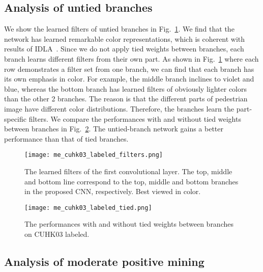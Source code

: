 \documentclass[10pt,twocolumn,letterpaper]{article}
\begin{document}
\subsection{Analysis of untied branches}
\label{section_Filter_visualization}

We show the learned filters of untied branches in Fig.~\ref{fig_filters_cuhk03}.
We find that the network has learned remarkable color representations, which is coherent with results of IDLA~\cite{ahmed2015improved}.
Since we do not apply tied weights between branches, each branch learns different filters from their own part.
As shown in Fig.~\ref{fig_filters_cuhk03} where each row demonstrates a filter set from one branch,
we can find that each branch has its own emphasis in color.
For example, the middle branch inclines to violet and blue, whereas the bottom branch has learned filters of obviously lighter colors than the other 2 branches.
The reason is that the different parts of pedestrian image have different color distributions.
Therefore, the branches learn the part-specific filters.
We compare the performances with and without tied weights between branches in Fig.~\ref{fig_cmc_cuhk03_tied}.
The untied-branch network gains a better performance than that of tied branches.
\begin{figure}[!htb]
  \centering
  \texttt{[image: me\_cuhk03\_labeled\_filters.png]}
  \caption{The learned filters of the first convolutional layer. The top, middle and bottom line correspond to the top, middle and bottom branches in the proposed CNN, respectively. Best viewed in color.}
  \label{fig_filters_cuhk03}
\end{figure}
\begin{figure}[!htb]
  \centering
  \texttt{[image: me\_cuhk03\_labeled\_tied.png]}
  \caption{The performances with and without tied weights between branches on CUHK03 labeled.}
  \label{fig_cmc_cuhk03_tied}
\end{figure}

\subsection{Analysis of moderate positive mining}
\label{section_Analysis_of_moderate_positive_mining}
\end{document}
